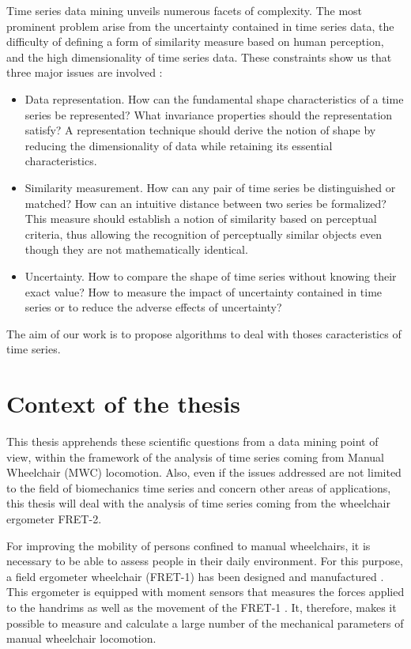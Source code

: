 Time series data mining unveils numerous facets of complexity. The most prominent
problem arise from the uncertainty contained in time series data,  the difficulty of
defining a form of similarity measure based on human perception, and the high dimensionality of time series data. These constraints show us that three major issues are involved :


\begin{itemize}
\item Data representation. How can the fundamental shape characteristics of a time series
be represented? What invariance properties should the representation satisfy? A
representation technique should derive the notion of shape by reducing the dimensionality
of data while retaining its essential characteristics.

\item Similarity measurement. How can any pair of time series be distinguished or
matched? How can an intuitive distance between two series be formalized? This
measure should establish a notion of similarity based on perceptual criteria, thus
allowing the recognition of perceptually similar objects even though they are not
mathematically identical.  

\item Uncertainty. How to compare the shape of time series without knowing their exact value? How to measure the impact of uncertainty contained in time series or to reduce the adverse effects of uncertainty? 
\end{itemize}

The aim of our work is to propose algorithms to deal with thoses caracteristics of time series.

\section*{Context of the thesis}
This thesis apprehends these scientific questions from a data mining point of view, within the framework of the analysis of time series coming from Manual Wheelchair (MWC) locomotion. Also, even if the issues addressed are not limited to the field of biomechanics time series and concern other areas of applications, this thesis will deal with the analysis of time series coming from the wheelchair ergometer FRET-2.


For improving the mobility of persons confined to manual wheelchairs, it is necessary to be able to assess people in their daily environment. For this purpose, a field ergometer wheelchair (FRET-1) has been designed and manufactured  \cite{dabonneville2005self}. This ergometer is equipped with  moment sensors that measures the forces applied to the handrims as well as the movement of the FRET-1 \cite{couetard2000}. It, therefore, makes it possible to measure and calculate a large number of the mechanical parameters of manual wheelchair locomotion.



